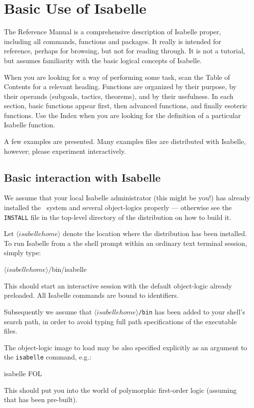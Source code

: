 

\chapter{Basic Use of Isabelle} 
The Reference Manual is a comprehensive description of Isabelle
proper, including all \ML{} commands, functions and packages.  It
really is intended for reference, perhaps for browsing, but not for
reading through.  It is not a tutorial, but assumes familiarity with
the basic logical concepts of Isabelle.

When you are looking for a way of performing some task, scan the Table of
Contents for a relevant heading.  Functions are organized by their purpose,
by their operands (subgoals, tactics, theorems), and by their usefulness.
In each section, basic functions appear first, then advanced functions, and
finally esoteric functions.  Use the Index when you are looking for the
definition of a particular Isabelle function.

A few examples are presented.  Many examples files are distributed with
Isabelle, however; please experiment interactively.


\section{Basic interaction with Isabelle}
\nobreak
%
We assume that your local Isabelle administrator (this might be you!)
has already installed the \Pure\ system and several object-logics
properly --- otherwise see the {\tt INSTALL} file in the top-level
directory of the distribution on how to build it.

\medskip Let $\langle isabellehome \rangle$ denote the location where
the distribution has been installed.  To run Isabelle from a the shell
prompt within an ordinary text terminal session, simply type:
\begin{ttbox}
\({\langle}isabellehome{\rangle}\)/bin/isabelle
\end{ttbox}
This should start an interactive \ML{} session with the default
object-logic already preloaded.  All Isabelle commands are bound to
\ML{} identifiers.

Subsequently we assume that {\tt \(\langle isabellehome \rangle\)/bin}
has been added to your shell's search path, in order to avoid typing
full path specifications of the executable files.

The object-logic image to load may be also specified explicitly as an
argument to the {\tt isabelle} command, e.g.:
\begin{ttbox}
isabelle FOL
\end{ttbox}
This should put you into the world of polymorphic first-order logic
(assuming that {\FOL} has been pre-built).

